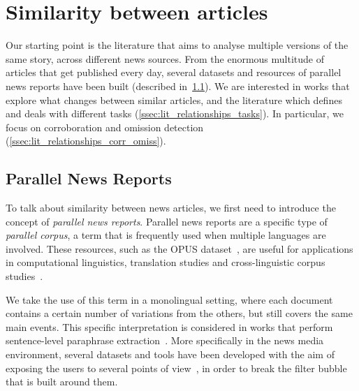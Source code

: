 




\section{\statusgreen Similarity between articles}
\label{sec:lit_relationships}

Our starting point is the literature that aims to analyse multiple versions of the same story, across different news sources.
From the enormous multitude of articles that get published every day, several datasets and resources of parallel news reports have been built (described in~\ref{ssec:lit_relationships_parallel}).
We are interested in works that explore what changes between similar articles, and the literature which defines and deals with different tasks (\ref{ssec:lit_relationships_tasks}). In particular, we focus on corroboration and omission detection (\ref{ssec:lit_relationships_corr_omiss}).

\subsection{\statusgreen Parallel News Reports}
\label{ssec:lit_relationships_parallel}

To talk about similarity between news articles, we first need to introduce the concept of \emph{parallel news reports}.
%
Parallel news reports are a specific type of \emph{parallel corpus}, a term that is frequently used when multiple languages are involved.
These resources, such as the OPUS dataset~\citep{tiedemann2012parallel}, are useful for applications in computational linguistics, translation studies and cross-linguistic corpus studies~\citep{brown1991aligning,ramesh2022samanantar,ziemski2016united,kunchukuttan2017iit,banon2020paracrawl}.

We take the use of this term in a monolingual setting, where each document contains a certain number of variations from the others, but still covers the same main events.
This specific interpretation is considered in works that perform sentence-level paraphrase extraction~\citep{dolan2004unsupervised,zhang2013harvesting}.
More specifically in the news media environment, several datasets and tools have been developed with the aim of exposing the users to several points of view~\citep{bozdag2015breaking}, in order to break the filter bubble~\citep{pariser2011filter}
that is built around them.

